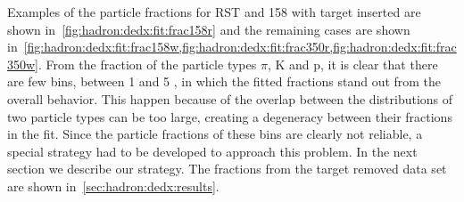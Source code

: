 Examples of the particle fractions for RST and 158 \GeVc
with target inserted
are shown in~\cref{fig:hadron:dedx:fit:frac158r}
and the remaining cases are shown
in~\cref{fig:hadron:dedx:fit:frac158w,fig:hadron:dedx:fit:frac350r,fig:hadron:dedx:fit:frac350w}.
From the fraction of the particle types $\pi$, K and p, it is clear that
there are few \pp bins, between 1 and 5 \GeVc, in which the fitted fractions
stand out from the overall behavior. This happen because of the overlap between
the \dedx distributions of two particle types can be too large, creating
a degeneracy between their fractions in the fit. Since the particle fractions
of these \pp bins are clearly not reliable, a special strategy had to be
developed to approach this problem. In the next section we describe our strategy.
The fractions from the target removed data set are shown in~\cref{sec:hadron:dedx:results}.


